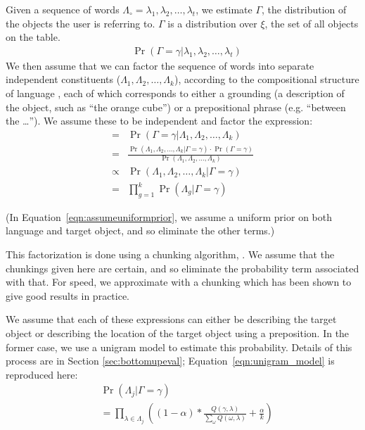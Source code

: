 \documentclass[conference]{IEEEtran}
\numberwithin{equation}{section}
\begin{document}
Given a sequence of words $\Lambda_\circ = \lambda_1, \lambda_2, \ldots, \lambda_t$, we estimate $\Gamma$, the distribution of the objects the user is referring to. $\Gamma$ is a distribution over $\xi$, the set of all objects on the table.
\begin{align}
	& \Pr(\Gamma = \gamma | \lambda_1, \lambda_2, \ldots, \lambda_t)
\end{align}
We then assume that we can factor the sequence of words into separate independent constituents ($\Lambda_1, \Lambda_2, \ldots, \Lambda_k$), according to the compositional structure of language \citep{heim1998semantics}, each of which corresponds to either a grounding (a description of the object, such as ``the orange cube'') or a prepositional phrase (e.g. ``between the \ldots''). We assume these to be independent and factor the expression:
\begin{align}
   = & \Pr(\Gamma = \gamma | \Lambda_1, \Lambda_2, \ldots, \Lambda_k) 
\\ = & \frac{\Pr(\Lambda_1, \Lambda_2, \ldots, \Lambda_k | \Gamma = \gamma) \cdot \Pr(\Gamma = \gamma)}{\Pr(\Lambda_1, \Lambda_2, \ldots, \Lambda_k)}
\\ \propto & \Pr(\Lambda_1, \Lambda_2, \ldots, \Lambda_k | \Gamma = \gamma)\label{eqn:assumeuniformprior}
\\ = & \prod_{g=1}^k \Pr(\Lambda_g | \Gamma = \gamma) \label{eqn:combinedistribs}
\end{align}

(In Equation~\ref{eqn:assumeuniformprior}, we assume a uniform prior on both language and target object, and so eliminate the other terms.)

This factorization is done using a chunking algorithm, \citep{McCallumMALLET}. We assume that the chunkings given here are certain, and so eliminate the probability term associated with that. For speed, we approximate with a chunking which has been shown to give good results in practice.

We assume that each of these expressions can either be describing the target object or describing the location of the target object using a preposition. In the former case, we use a unigram model to estimate this probability. Details of this process are in Section \ref{sec:bottomupeval}; Equation~\ref{eqn:unigram_model} is reproduced here:
\begin{align*}
   & \Pr(\Lambda_j | \Gamma = \gamma) 
\\ & = \prod_{\lambda \in \Lambda_j} \left( (1 - \alpha) * \frac{Q(\gamma, \lambda)}{\sum_{\omega} Q(\omega, \lambda)} + \frac{\alpha}{k} \right) \end{align*}
\end{document}
